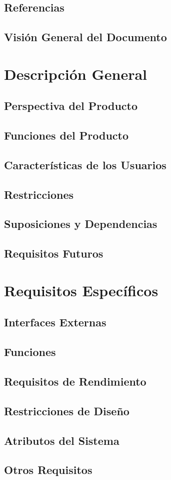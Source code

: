 \documentclass[12pt,a4paper]{article}
\begin{document}
\subsection{Referencias}
\subsection{Visión General del Documento}
\section{Descripción General}
\subsection{Perspectiva del Producto}
\subsection{Funciones del Producto}
\subsection{Características de los Usuarios}
\subsection{Restricciones}
\subsection{Suposiciones y Dependencias}
\subsection{Requisitos Futuros}
\section{Requisitos Específicos}
\subsection{Interfaces Externas}
\subsection{Funciones}
\subsection{Requisitos de Rendimiento}
\subsection{Restricciones de Diseño}
\subsection{Atributos del Sistema}
\subsection{Otros Requisitos}
\end{document}
